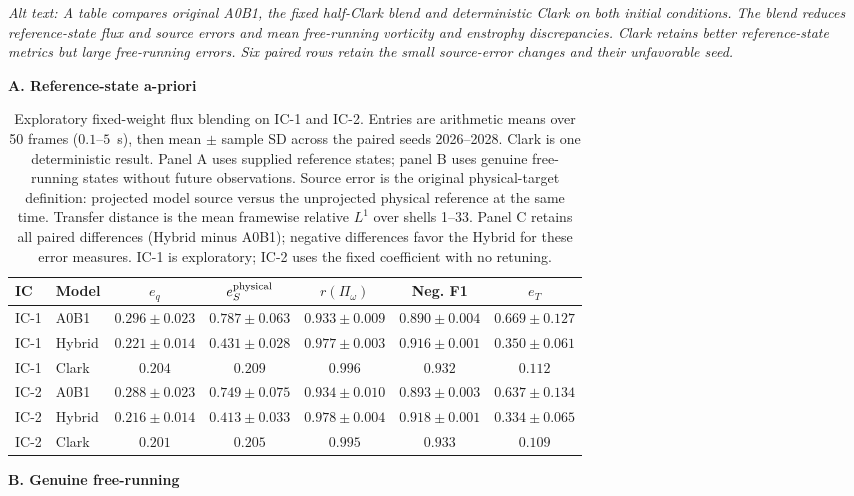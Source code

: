 \begin{table}[H]
\centering\footnotesize\setlength{\tabcolsep}{4pt}
\caption{Exploratory fixed-weight flux blending on IC-1 and IC-2.
Entries are arithmetic means over 50 frames ($0.1$--$5$~s), then
mean $\pm$ sample SD across the paired seeds 2026--2028. Clark is one
deterministic result. Panel A uses supplied reference states; panel B
uses genuine free-running states without future observations. Source
error is the original physical-target definition: projected model source
versus the unprojected physical reference at the same time. Transfer
distance is the mean framewise relative $L^1$ over shells 1--33. Panel C
retains all paired differences (Hybrid minus A0B1); negative differences
favor the Hybrid for these error measures. IC-1 is exploratory; IC-2 uses
the fixed coefficient with no retuning.}
\label{tab:hybrid}
\par\smallskip\noindent\textit{Alt text: A table compares original A0B1,
the fixed half-Clark blend and deterministic Clark on both initial
conditions. The blend reduces reference-state flux and source errors and
mean free-running vorticity and enstrophy discrepancies. Clark retains
better reference-state metrics but large free-running errors. Six paired
rows retain the small source-error changes and their unfavorable seed.}\par\medskip
\textbf{A. Reference-state a-priori}\par\smallskip
\begin{tabular}{llccccc}\toprule
IC & Model & $e_q$ & $e_S^{\rm physical}$ & $r(\Pi_\omega)$ & Neg. F1 & $e_T$\\\midrule
IC-1 & A0B1 & $0.296\pm0.023$ & $0.787\pm0.063$ & $0.933\pm0.009$ & $0.890\pm0.004$ & $0.669\pm0.127$ \\
IC-1 & Hybrid & $0.221\pm0.014$ & $0.431\pm0.028$ & $0.977\pm0.003$ & $0.916\pm0.001$ & $0.350\pm0.061$ \\
IC-1 & Clark & $0.204$ & $0.209$ & $0.996$ & $0.932$ & $0.112$ \\
IC-2 & A0B1 & $0.288\pm0.023$ & $0.749\pm0.075$ & $0.934\pm0.010$ & $0.893\pm0.003$ & $0.637\pm0.134$ \\
IC-2 & Hybrid & $0.216\pm0.014$ & $0.413\pm0.033$ & $0.978\pm0.004$ & $0.918\pm0.001$ & $0.334\pm0.065$ \\
IC-2 & Clark & $0.201$ & $0.205$ & $0.995$ & $0.933$ & $0.109$ \\
\bottomrule\end{tabular}\par\medskip
\textbf{B. Genuine free-running}\par\smallskip

\end{table}
